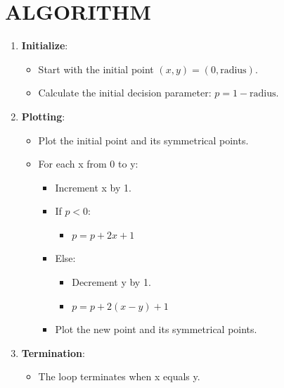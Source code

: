 \documentclass{article}
\begin{document}
\section*{ALGORITHM}
\begin{enumerate}
    \item \textbf{Initialize}:
    \begin{itemize}
        \item Start with the initial point $(x, y) = (0, \text{radius})$.
        \item Calculate the initial decision parameter: $p = 1 - \text{radius}$.
    \end{itemize}
    \item \textbf{Plotting}:
    \begin{itemize}
        \item Plot the initial point and its symmetrical points.
        \item For each x from 0 to y:
        \begin{itemize}
            \item Increment x by 1.
            \item If $p < 0$:
            \begin{itemize}
                \item $p = p + 2x + 1$
            \end{itemize}
            \item Else:
            \begin{itemize}
                \item Decrement y by 1.
                \item $p = p + 2(x - y) + 1$
            \end{itemize}
            \item Plot the new point and its symmetrical points.
        \end{itemize}
    \end{itemize}
    \item \textbf{Termination}:
    \begin{itemize}
        \item The loop terminates when x equals y.
    \end{itemize}
\end{enumerate}
\end{document}
